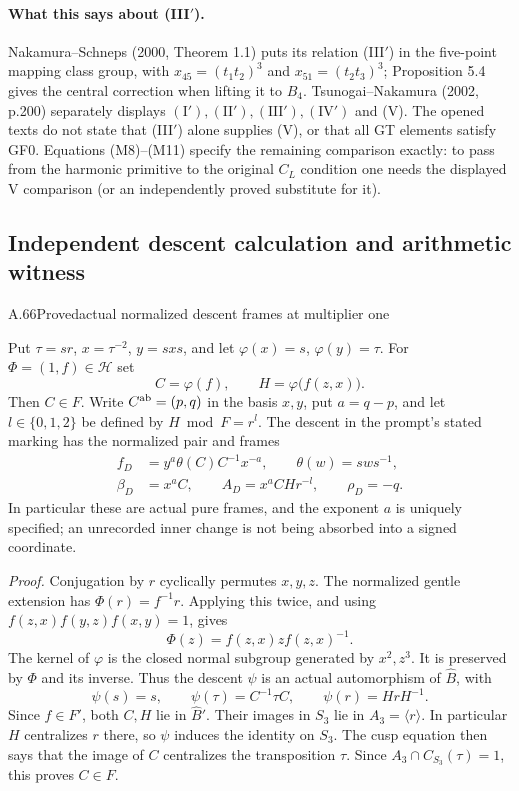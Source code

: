 \paragraph{What this says about (III$'$).}
Nakamura--Schneps (2000, Theorem 1.1) puts its relation (III$'$) in
the five-point mapping class group, with
$x_{45}=(t_1t_2)^3$ and $x_{51}=(t_2t_3)^3$; Proposition 5.4
gives the central correction when lifting it to $B_4$.
Tsunogai--Nakamura (2002, p.200) separately displays
$(\mathrm I'),(\mathrm{II}'),(\mathrm{III}'),(\mathrm{IV}')$ and (V).
The opened texts do not state that (III$'$) alone supplies (V), or
that all GT elements satisfy GF0. Equations (M8)--(M11) specify
the remaining comparison exactly: to pass from the harmonic
primitive to the original $C_L$ condition one needs the displayed
V comparison (or an independently proved substitute for it).

\subsection{Independent descent calculation and arithmetic witness}


\begin{statement}{A.66}{Proved}{actual normalized descent frames at multiplier one}
\end{statement}
Put $\tau=sr$, $x=\tau^{-2}$, $y=sxs$, and let
$\varphi(x)=s$, $\varphi(y)=\tau$. For $\Phi=(1,f)\in\mathcal H$ set
\[
 C=\varphi(f),\qquad H=\varphi\bigl(f(z,x)\bigr).
\]
Then $C\in F$. Write $C^{\rm ab}=(p,q)$ in the basis $x,y$, put
$a=q-p$, and let $l\in\{0,1,2\}$ be defined by
$H\bmod F=r^l$. The descent in the prompt's stated marking has
the normalized pair and frames
\begin{align*}
 f_D&=y^a\theta(C)C^{-1}x^{-a},\qquad \theta(w)=sws^{-1},\\
 \beta_D&=x^aC,\qquad A_D=x^aCHr^{-l},\qquad \rho_D=-q.
\end{align*}
In particular these are actual pure frames, and the exponent $a$ is
uniquely specified; an unrecorded inner change is not being absorbed
into a signed coordinate.

\emph{Proof.}
Conjugation by $r$ cyclically permutes $x,y,z$. The normalized gentle
extension has $\Phi(r)=f^{-1}r$. Applying this twice, and using
$f(z,x)f(y,z)f(x,y)=1$, gives
\[
 \Phi(z)=f(z,x)z f(z,x)^{-1}.
\]
The kernel of $\varphi$ is the closed normal subgroup generated by
$x^2,z^3$. It is preserved by $\Phi$ and its inverse. Thus the descent
$\psi$ is an actual automorphism of $\widehat B$, with
\[
 \psi(s)=s,\qquad \psi(\tau)=C^{-1}\tau C,
 \qquad \psi(r)=HrH^{-1}.
\]
Since $f\in F'$, both $C,H$ lie in $\widehat B'$. Their images in
$S_3$ lie in $A_3=\langle r\rangle$. In particular $H$ centralizes
$r$ there, so $\psi$ induces the identity on $S_3$. The cusp equation
then says that the image of $C$ centralizes the transposition $\tau$.
Since $A_3\cap C_{S_3}(\tau)=1$, this proves $C\in F$.

